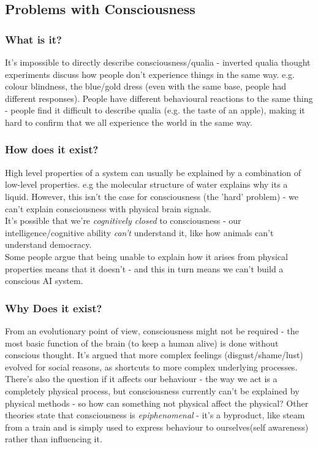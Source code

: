 \subsection{Problems with Consciousness}

\subsubsection{What is it?}
It's impossible to directly describe consciousness/qualia - inverted qualia thought experiments discuss how people don't experience things in the same way. e.g. colour blindness, the blue/gold dress (even with the same base, people had different responses). People have different behavioural reactions to the same thing - people find it difficult to describe qualia (e.g. the taste of an apple), making it hard to confirm that we all experience the world in the same way. 

\subsubsection{How does it exist?}
High level properties of a system can usually be explained by a combination of low-level properties. e.g the molecular structure of water explains why its a liquid. However, this isn't the case for consciousness (the 'hard' problem) - we can't explain consciousness with physical brain signals.\\

It's possible that we're \emph{cognitively closed} to consciousness - our intelligence/cognitive ability \emph{can't} understand it, like how animals can't understand democracy.\\

Some people argue that being unable to explain how it arises from physical properties means that it doesn't - and this in turn means we can't build a conscious AI system.

\subsubsection{Why Does it exist?}
From an evolutionary point of view, consciousness might not be required - the most basic function of the brain (to keep a human alive) is done without conscious thought. It's argued that more complex feelings (disgust/shame/lust) evolved for social reasons, as shortcuts to more complex underlying processes. \\

There's also the question if it affects our behaviour - the way we act is a completely physical process, but consciousness currently can't be explained by physical methods - so how can something not physical affect the physical? Other theories state that consciousness is \emph{epiphenomenal} - it's a byproduct, like steam from a train and is simply used to express behaviour to ourselves(self awareness) rather than influencing it.

